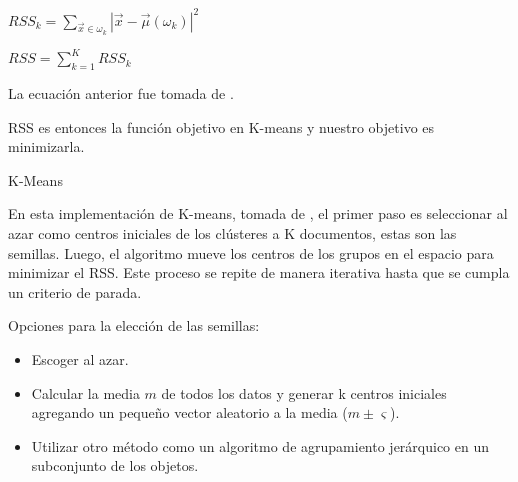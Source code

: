 \documentclass{llncs}
\DeclareMathOperator*{\argmin}{arg\,min}
\begin{document}
	\begin{center}
		$ RSS_{k} = \sum_{\overrightarrow{x} \in \omega_{k}}|\overrightarrow{x} - \overrightarrow{\mu}(\omega_{k})|^2$
	
	\vspace{1em}
	$ RSS = \sum_{k=1}^{K} RSS_{k} $
	\end{center}
	
	La ecuaci\'on anterior fue tomada de \cite[Ecuaci\'on 16.7, p.360]{B1}.
	
	RSS es entonces la función objetivo en K-means y nuestro objetivo es minimizarla.
	
	\begin{algorithm}
		\caption{K-Means} 
		\begin{algorithmic}[1]
			\EndFor
				\EndFor
				\State{$ j \leftarrow \argmin_{j'}|\overrightarrow{\mu_{j'}}-\overrightarrow{x_{n}}| $}
				\EndFor
				\EndFor
			\EndWhile
		\end{algorithmic}
	\end{algorithm}

En esta implementaci\'on de K-means, tomada de \cite[Figura 16.5, p.361]{B1}, el primer paso es seleccionar al azar como centros iniciales de los cl\'usteres a K documentos, estas son las semillas. Luego, el algoritmo mueve los centros de los grupos en el espacio para minimizar el RSS. Este proceso se repite de manera iterativa hasta que se cumpla un criterio de parada.

\vspace{0.5em}
Opciones para la elecci\'on de las semillas:
\begin{itemize}
	\item Escoger al azar.
	\item Calcular la media $ m $ de todos los datos y generar k centros iniciales agregando un pequeño vector aleatorio a la media ($ m \pm \varsigma $).
	\item Utilizar otro método como un algoritmo de agrupamiento jerárquico en un subconjunto de los objetos.
\end{itemize}
\end{document}
